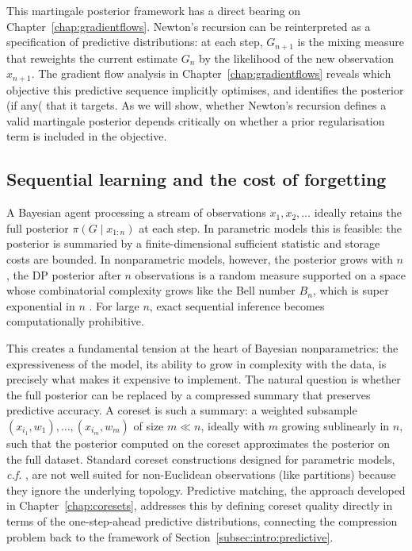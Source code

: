 This martingale posterior framework has a direct bearing on
Chapter~\ref{chap:gradientflows}.  Newton's recursion can be reinterpreted
as a specification of predictive distributions: at each step, $G_{n+1}$ is
the mixing measure that reweights the current estimate $G_n$ by the
likelihood of the new observation $x_{n+1}$.  The gradient flow analysis
in Chapter~\ref{chap:gradientflows} reveals which objective this predictive
sequence implicitly optimises, and identifies the posterior (if any(
that it targets.  As we will show, whether Newton's recursion defines a
valid martingale posterior depends critically on whether a prior
regularisation term is included in the objective.

\subsection{Sequential learning and the cost of forgetting}
\label{subsec:intro:compression}

A Bayesian agent processing a stream of observations $x_1, x_2, \ldots$
ideally retains the full posterior $\pi(G \mid x_{1:n})$ at each step.  In
parametric models this is feasible: the posterior is summaried by a
finite-dimensional sufficient statistic and storage costs are bounded.  In
nonparametric models, however, the posterior grows with $n$, the DP
posterior after $n$ observations is a random measure supported on a space
whose combinatorial complexity grows like the Bell number $B_n$, which is
super exponential in $n$ \citep{Rota1964}.  For large $n$, exact
sequential inference becomes computationally prohibitive.

This creates a fundamental tension at the heart of Bayesian nonparametrics: the expressiveness of the model, its ability to grow in
complexity with the data, is precisely what makes it expensive to
implement.  The natural question is whether the full posterior can be
replaced by a compressed summary that preserves predictive accuracy.  A
coreset is such a summary: a weighted subsample
$(x_{i_1}, w_1), \ldots, (x_{i_m}, w_m)$ of size $m \ll n$, ideally with
$m$ growing sublinearly in $n$, such that the posterior computed on the
coreset approximates the posterior on the full dataset.  Standard coreset
constructions designed for parametric models, \emph{c.f.} \citep{HugginsCampbellBroderick2016, CampbellBroderick2018}, are not well suited for non-Euclidean observations (like partitions) because they ignore the underlying topology.  Predictive matching, the approach developed in
Chapter~\ref{chap:coresets}, addresses this by defining coreset quality
directly in terms of the one-step-ahead predictive distributions,
connecting the compression problem back to the framework of
Section~\ref{subsec:intro:predictive}.

